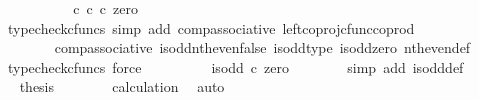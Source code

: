 \begin{isabellebody}
\ \ \ \ \isamarkupfalse%
\ \isamarkupfalse%
\ {\isachardoublequoteopen}{\isachardot}{\kern0pt}{\isachardot}{\kern0pt}{\isachardot}{\kern0pt}\ {\isacharequal}{\kern0pt}\ {\isacharparenleft}{\kern0pt}{\isasymf}\ {\isasymcirc}\isactrlsub c\ {\isasymbeta}\isactrlbsub {\isasymnat}\isactrlsub c\isactrlesub {\isacharparenright}{\kern0pt}\ {\isasymcirc}\isactrlsub c\ zero{\isachardoublequoteclose}\isanewline
\ \ \ \ \ \ \isamarkupfalse%
\ {\isacharparenleft}{\kern0pt}typecheck{\isacharunderscore}{\kern0pt}cfuncs{\isacharcomma}{\kern0pt}\ simp\ add{\isacharcolon}{\kern0pt}\ comp{\isacharunderscore}{\kern0pt}associative{}\ left{\isacharunderscore}{\kern0pt}coproj{\isacharunderscore}{\kern0pt}cfunc{\isacharunderscore}{\kern0pt}coprod{\isacharparenright}{\kern0pt}\isanewline
\ \ \ \ \isamarkupfalse%
\ \isamarkupfalse%
\ {\isachardoublequoteopen}{\isachardot}{\kern0pt}{\isachardot}{\kern0pt}{\isachardot}{\kern0pt}\ {\isacharequal}{\kern0pt}\ {\isasymf}{\isachardoublequoteclose}\isanewline
\ \ \ \ \ \ \isamarkupfalse%
\ comp{\isacharunderscore}{\kern0pt}associative{}\ is{\isacharunderscore}{\kern0pt}odd{\isacharunderscore}{\kern0pt}nth{\isacharunderscore}{\kern0pt}even{\isacharunderscore}{\kern0pt}false\ is{\isacharunderscore}{\kern0pt}odd{\isacharunderscore}{\kern0pt}type\ is{\isacharunderscore}{\kern0pt}odd{\isacharunderscore}{\kern0pt}zero\ nth{\isacharunderscore}{\kern0pt}even{\isacharunderscore}{\kern0pt}def{}\ \isamarkupfalse%
\ {\isacharparenleft}{\kern0pt}typecheck{\isacharunderscore}{\kern0pt}cfuncs{\isacharcomma}{\kern0pt}\ force{\isacharparenright}{\kern0pt}\isanewline
\ \ \ \ \isamarkupfalse%
\ \isamarkupfalse%
\ {\isachardoublequoteopen}{\isachardot}{\kern0pt}{\isachardot}{\kern0pt}{\isachardot}{\kern0pt}\ {\isacharequal}{\kern0pt}\ is{\isacharunderscore}{\kern0pt}odd\ {\isasymcirc}\isactrlsub c\ zero{\isachardoublequoteclose}\isanewline
\ \ \ \ \ \ \isamarkupfalse%
\ {\isacharparenleft}{\kern0pt}simp\ add{\isacharcolon}{\kern0pt}\ is{\isacharunderscore}{\kern0pt}odd{\isacharunderscore}{\kern0pt}def{}{\isacharparenright}{\kern0pt}\isanewline
\ \ \ \ \isamarkupfalse%
\ \isamarkupfalse%
\ {\isacharquery}{\kern0pt}thesis\isanewline
\ \ \ \ \ \ \isamarkupfalse%
\ calculation\ \isamarkupfalse%
\ auto\isanewline
\ \ \isamarkupfalse%
\isanewline
\isanewline
\ \ \isamarkupfalse%

\end{isabellebody}
